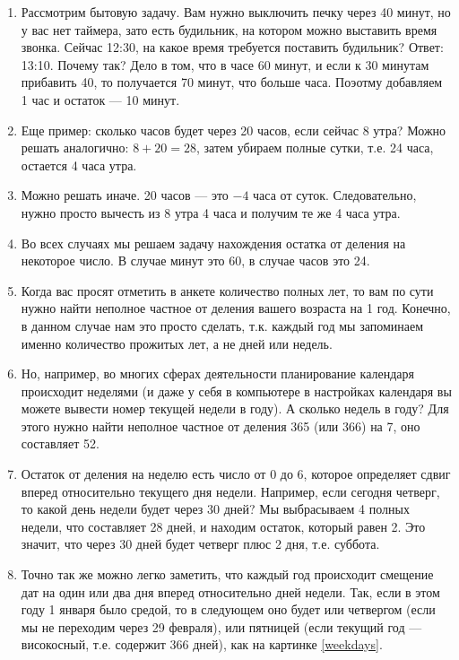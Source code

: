 \begin{enumerate}
\item Рассмотрим бытовую задачу. Вам нужно выключить печку через 40 минут, но у вас нет таймера, зато есть будильник, на котором можно выставить время звонка. Сейчас 12:30, на какое время требуется поставить будильник? Ответ: 13:10. Почему так? Дело в том, что в часе 60 минут, и если к 30 минутам прибавить 40, то получается 70 минут, что больше часа. Поэотму добавляем 1 час и остаток --- 10 минут.
\item Еще пример: сколько часов будет через 20 часов, если сейчас 8 утра? Можно решать аналогично: $8+20=28$, затем убираем полные сутки, т.е. 24 часа, остается 4 часа утра.
\item Можно решать иначе. 20 часов --- это $-4$ часа от суток. Следовательно, нужно просто вычесть из 8 утра 4 часа и получим те же 4 часа утра.
\item Во всех случаях мы решаем задачу нахождения остатка от деления на некоторое число. В случае минут это 60, в случае часов это 24.
\item Когда вас просят отметить в анкете количество полных лет, то вам по сути нужно найти неполное частное от деления вашего возраста на 1 год. Конечно, в данном случае нам это просто сделать, т.к. каждый год мы запоминаем именно количество прожитых лет, а не дней или недель.
\item Но, например, во многих сферах деятельности планирование календаря происходит неделями (и даже у себя в компьютере в настройках календаря вы можете вывести номер текущей недели в году). А сколько недель в году? Для этого нужно найти неполное частное от деления 365 (или 366) на 7, оно составляет 52.
\item Остаток от деления на неделю есть число от 0 до 6, которое определяет сдвиг вперед относительно текущего дня недели. Например, если сегодня четверг, то какой день недели будет через 30 дней? Мы выбрасываем 4 полных недели, что составляет 28 дней, и находим остаток, который равен 2. Это значит, что через 30 дней будет четверг плюс 2 дня, т.е. суббота.
\item Точно так же можно легко заметить, что каждый год происходит смещение дат на один или два дня вперед относительно дней недели. Так, если в этом году 1 января было средой, то в следующем оно будет или четвергом (если мы не переходим через 29 февраля), или пятницей (если текущий год --- високосный, т.е. содержит 366 дней), как на картинке \ref{weekdays}.
\begin{figure}[hbt!]
\begin{center}

\end{center}
\end{figure}
\end{enumerate}
